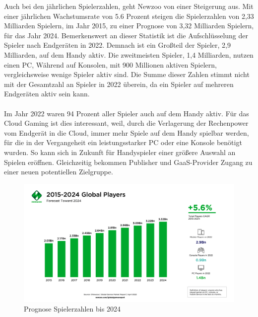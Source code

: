 \documentclass[12pt,toc=bib,toc=listof]{scrreprt}
\begin{document}
Auch bei den jährlichen Spielerzahlen, geht Newzoo von einer Steigerung aus. Mit einer jährlichen 
Wachstumsrate von 5.6 Prozent steigen die Spielerzahlen von 2,33 Milliarden Spielern, im Jahr 2015,
zu einer Prognose von 3,32 Milliarden Spielern, für das Jahr 2024. Bemerkenswert an dieser Statistik
ist die Aufschlüsselung der Spieler nach Endgeräten in 2022. Demnach ist ein Großteil der Spieler, 
2,9 Milliarden, auf dem Handy aktiv. Die zweitmeisten Spieler, 1,4 Milliarden, nutzen einen PC, Während
auf Konsolen, mit 900 Millionen aktiven Spielern, vergleichsweise wenige Spieler aktiv sind. 
Die Summe dieser Zahlen stimmt nicht mit der Gesamtzahl an Spieler in 2022 überein, da ein Spieler 
auf mehreren Endgeräten aktiv sein kann. 
\\ \\
Im Jahr 2022 waren 94 Prozent aller Spieler auch auf dem Handy aktiv. Für das Cloud Gaming ist dies interessant,
weil, durch die Verlagerung der Rechenpower vom Endgerät in die Cloud, immer mehr Spiele auf dem Handy spielbar werden, für
die in der Vergangeheit ein leistungsstarker PC oder eine Konsole benötigt wurden. So kann sich in Zukunft für Handyspieler 
einer größere Auswahl an Spielen eröffnen. Gleichzeitig bekommen Publisher und GaaS-Provider Zugang zu einer neuen potentiellen
Zielgruppe.
\\%
\begin{figure}[h]
 \centering
  \includegraphics[scale=0.12]{Abbildungen/Newzoo_Global_Players_Forecast.png} 
  \caption[Newzoo]{Prognose Spielerzahlen bis 2024}
\end{figure}
\\%
\end{document}
